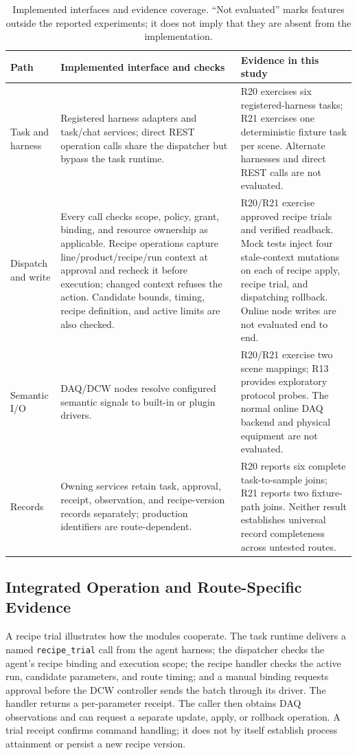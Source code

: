 \begin{table}[!t]
\centering
\caption{Implemented interfaces and evidence coverage. “Not evaluated” marks
features outside the reported experiments; it does not imply that they are
absent from the implementation.}
\label{tab:coverage}
\footnotesize
\setlength{\tabcolsep}{3pt}
\begin{tabularx}{\textwidth}{@{}p{2.0cm}X X@{}}
\toprule
Path & Implemented interface and checks & Evidence in this study \\
\midrule
Task and harness & Registered harness adapters and task/chat services; direct REST operation calls share the dispatcher but bypass the task runtime. & R20 exercises six registered-harness tasks; R21 exercises one deterministic fixture task per scene. Alternate harnesses and direct REST calls are not evaluated. \\
Dispatch and write & Every call checks scope, policy, grant, binding, and resource ownership as applicable. Recipe operations capture line/product/recipe/run context at approval and recheck it before execution; changed context refuses the action. Candidate bounds, timing, recipe definition, and active limits are also checked. & R20/R21 exercise approved recipe trials and verified readback. Mock tests inject four stale-context mutations on each of recipe apply, recipe trial, and dispatching rollback. Online node writes are not evaluated end to end. \\
Semantic I/O & DAQ/DCW nodes resolve configured semantic signals to built-in or plugin drivers. & R20/R21 exercise two scene mappings; R13 provides exploratory protocol probes. The normal online DAQ backend and physical equipment are not evaluated. \\
Records & Owning services retain task, approval, receipt, observation, and recipe-version records separately; production identifiers are route-dependent. & R20 reports six complete task-to-sample joins; R21 reports two fixture-path joins. Neither result establishes universal record completeness across untested routes. \\
\bottomrule
\end{tabularx}
\end{table}

\subsection{Integrated Operation and Route-Specific Evidence}
\label{sec:tasklifecycle}
A recipe trial illustrates how the modules cooperate. The task runtime
delivers a named \texttt{recipe\_trial} call from the agent harness; the
dispatcher checks the agent's recipe binding and execution scope; the recipe
handler checks the active run, candidate parameters, and route timing; and a
manual binding requests approval before the DCW controller sends the batch
through its driver. The handler returns a per-parameter receipt. The caller
then obtains DAQ observations and can request a separate update, apply, or
rollback operation. A trial receipt confirms command handling; it does not
by itself establish process attainment or persist a new recipe version.

